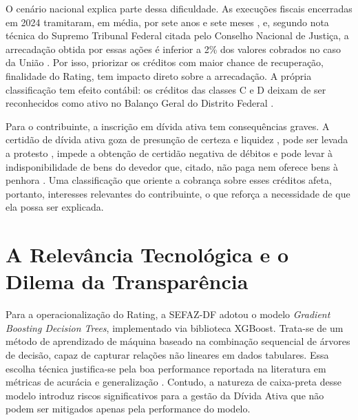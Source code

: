 O cenário nacional explica parte dessa dificuldade. As execuções fiscais encerradas em 2024 tramitaram, em média, por sete anos e sete meses \cite{cnjJusticaNumeros2025}, e, segundo nota técnica do Supremo Tribunal Federal citada pelo Conselho Nacional de Justiça, a arrecadação obtida por essas ações é inferior a 2\% dos valores cobrados no caso da União \cite{cnjEficienciaJudicial2025}. Por isso, priorizar os créditos com maior chance de recuperação, finalidade do Rating, tem impacto direto sobre a arrecadação. A própria classificação tem efeito contábil: os créditos das classes C e D deixam de ser reconhecidos como ativo no Balanço Geral do Distrito Federal \cite{distritofederalLC10262023}.

Para o contribuinte, a inscrição em dívida ativa tem consequências graves. A certidão de dívida ativa goza de presunção de certeza e liquidez \cite{brasilLEF1980}, pode ser levada a protesto \cite{brasilProtesto1997}, impede a obtenção de certidão negativa de débitos e pode levar à indisponibilidade de bens do devedor que, citado, não paga nem oferece bens à penhora \cite{brasilCTN1966}. Uma classificação que oriente a cobrança sobre esses créditos afeta, portanto, interesses relevantes do contribuinte, o que reforça a necessidade de que ela possa ser explicada.

\section{A Relevância Tecnológica e o Dilema da Transparência}

Para a operacionalização do Rating, a SEFAZ-DF adotou o modelo \textit{Gradient Boosting Decision Trees}, implementado via biblioteca XGBoost. Trata-se de um método de aprendizado de máquina baseado na combinação sequencial de árvores de decisão, capaz de capturar relações não lineares em dados tabulares. Essa escolha técnica justifica-se pela boa performance reportada na literatura em métricas de acurácia e generalização \cite{tianCreditRiskAssessment2020}. Contudo, a natureza de caixa-preta desse modelo introduz riscos significativos para a gestão da Dívida Ativa que não podem ser mitigados apenas pela performance do modelo.

